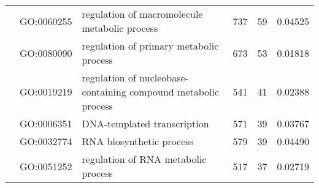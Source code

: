 \documentclass[../main.tex]{subfiles}
\begin{document}
\begin{landscape}
\begin{longtable}{@{}lllccr@{}}
		\endhead
		\endfoot
		\endlastfoot
		\multirow{21}{*}{\textbf{Bivalvia}}            & GO:0060255                         & regulation of macromolecule metabolic process                             & 737                                                                & 59                                                                   & 0.04525                                                                                  \\
		                                               & GO:0080090                         & regulation of primary metabolic process                                   & 673                                                                & 53                                                                   & 0.01818                                                                                  \\
		                                               & GO:0019219                         & regulation of nucleobase-containing compound metabolic process            & 541                                                                & 41                                                                   & 0.02388                                                                                  \\
		                                               & GO:0006351                         & DNA-templated transcription                                               & 571                                                                & 39                                                                   & 0.03767                                                                                  \\
		                                               & GO:0032774                         & RNA biosynthetic process                                                  & 579                                                                & 39                                                                   & 0.04490                                                                                  \\
		                                               & GO:0051252                         & regulation of RNA metabolic process                                       & 517                                                                & 37                                                                   & 0.02719                                                                                  \\

\end{longtable}
\end{landscape}
\end{document}
